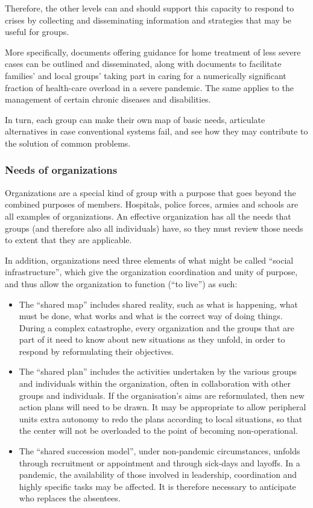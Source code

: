 \documentclass[12pt, a4]{scrartcl}
\begin{document}
Therefore, the other levels can and should support this capacity to respond to crises by collecting and disseminating information and strategies that may be useful for groups.

More specifically, documents offering guidance for home treatment of less severe cases can be outlined and disseminated, along with documents to facilitate families’ and local groups’ taking part in caring for a numerically significant fraction of health-care overload in a severe pandemic. The same applies to the management of certain chronic diseases and disabilities. 

In turn, each group can make their own map of basic needs, articulate alternatives in case conventional systems fail, and see how they may contribute to the solution of common problems.

\subsubsection{Needs of organizations}
Organizations are a special kind of group with a purpose that goes beyond the combined purposes of members. Hospitals, police forces, armies and schools are all examples of organizations. An effective organization has all the needs that groups (and therefore also all individuals) have, so they must review those needs to extent that they are applicable.

In addition, organizations need three elements of what might be called “social infrastructure”, which give the organization coordination and unity of purpose, and thus allow the organization to function (“to live”) as such:

\begin{itemize}
	\item The “shared map” includes shared reality, such as what is happening, what must be done, what works and what is the correct way of doing things. During a complex catastrophe, every organization and the groups that are part of it need to know about new situations as they unfold, in order to respond by reformulating their objectives.
	\item The “shared plan” includes the activities undertaken by the various groups and individuals within the organization, often in collaboration with other groups and individuals. If the organisation's aims are reformulated, then new action plans will need to be drawn. It may be appropriate to allow peripheral units extra autonomy to redo the plans according to local situations, so that the center will not be overloaded to the point of becoming non-operational.
	\item The “shared succession model”, under non-pandemic circumstances, unfolds through recruitment or appointment and through sick-days and layoffs. In a pandemic, the availability of those involved in leadership, coordination and highly specific tasks may be affected. It is therefore necessary to anticipate who replaces the absentees.
\end{itemize}
\end{document}
